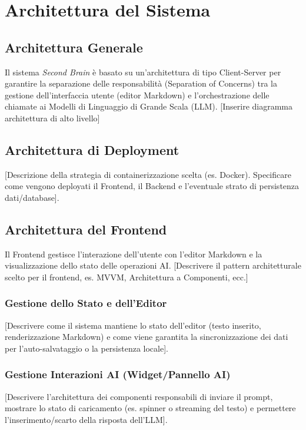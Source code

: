 \section{Architettura del Sistema}

\subsection{Architettura Generale}
Il sistema \textit{Second Brain} è basato su un'architettura di tipo Client-Server per garantire la separazione delle responsabilità (Separation of Concerns) tra la gestione dell'interfaccia utente (editor Markdown) e l'orchestrazione delle chiamate ai Modelli di Linguaggio di Grande Scala (LLM).
[Inserire diagramma architettura di alto livello]

\subsection{Architettura di Deployment}
[Descrizione della strategia di containerizzazione scelta (es. Docker). Specificare come vengono deployati il Frontend, il Backend e l'eventuale strato di persistenza dati/database].

\subsection{Architettura del Frontend}
Il Frontend gestisce l'interazione dell'utente con l'editor Markdown e la visualizzazione dello stato delle operazioni AI.
[Descrivere il pattern architetturale scelto per il frontend, es. MVVM, Architettura a Componenti, ecc.]

\subsubsection{Gestione dello Stato e dell'Editor}
[Descrivere come il sistema mantiene lo stato dell'editor (testo inserito, renderizzazione Markdown) e come viene garantita la sincronizzazione dei dati per l'auto-salvataggio o la persistenza locale].

\subsubsection{Gestione Interazioni AI (Widget/Pannello AI)}
[Descrivere l'architettura dei componenti responsabili di inviare il prompt, mostrare lo stato di caricamento (es. spinner o streaming del testo) e permettere l'inserimento/scarto della risposta dell'LLM].

